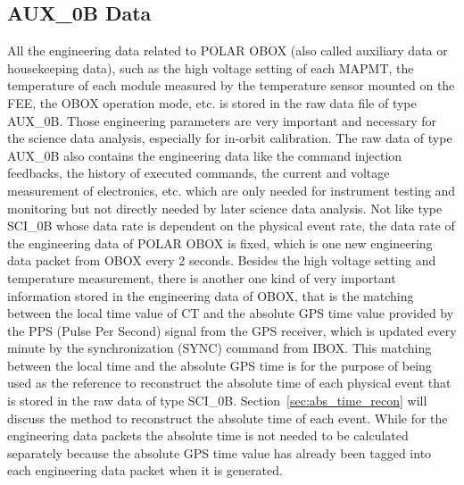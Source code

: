 \documentclass{raa}
\begin{document}
\subsection{AUX\_0B Data}
All the engineering data related to POLAR OBOX (also called auxiliary data or housekeeping data), such as the high voltage setting of each MAPMT, the temperature of each module measured by the temperature sensor mounted on the FEE, the OBOX operation mode, etc. is stored in the raw data file of type AUX\_0B. Those engineering parameters are very important and necessary for the science data analysis, especially for in-orbit calibration. The raw data of type AUX\_0B also contains the engineering data like the command injection feedbacks, the history of executed commands, the current and voltage measurement of electronics, etc. which are only needed for instrument testing and monitoring but not directly needed by later science data analysis. Not like type SCI\_0B whose data rate is dependent on the physical event rate, the data rate of the engineering data of POLAR OBOX is fixed, which is one new engineering data packet from OBOX every 2 seconds. Besides the high voltage setting and temperature measurement, there is another one kind of very important information stored in the engineering data of OBOX, that is the matching between the local time value of CT and the absolute GPS time value provided by the PPS (Pulse Per Second) signal from the GPS receiver, which is updated every minute by the synchronization (SYNC) command from IBOX. This matching between the local time and the absolute GPS time is for the purpose of being used as the reference to reconstruct the absolute time of each physical event that is stored in the raw data of type SCI\_0B. Section~\ref{sec:abs_time_recon} will discuss the method to reconstruct the absolute time of each event. While for the engineering data packets the absolute time is not needed to be calculated separately because the absolute GPS time value has already been tagged into each engineering data packet when it is generated.
\end{document}
